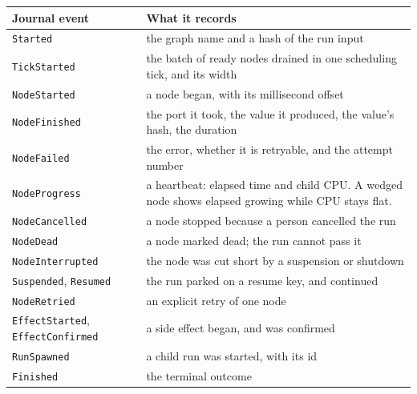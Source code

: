 \begin{center}
\begin{tabular}{@{}>{\raggedright\arraybackslash}p{}>{\raggedright\arraybackslash}p{}@{}}
  \toprule
  \textbf{Journal event} & \textbf{What it records} \\
  \midrule
  \texttt{Started} & the graph name and a hash of the run input \\
  \texttt{TickStarted} & the batch of ready nodes drained in one scheduling tick, and its width \\
  \texttt{NodeStarted} & a node began, with its millisecond offset \\
  \texttt{NodeFinished} & the port it took, the value it produced, the value's hash, the
    duration \\
  \texttt{NodeFailed} & the error, whether it is retryable, and the attempt number \\
  \texttt{NodeProgress} & a heartbeat: elapsed time and child CPU. A wedged node shows elapsed
    growing while CPU stays flat. \\
  \texttt{NodeCancelled} & a node stopped because a person cancelled the run \\
  \texttt{NodeDead} & a node marked dead; the run cannot pass it \\
  \texttt{NodeInterrupted} & the node was cut short by a suspension or shutdown \\
  \texttt{Suspended}, \texttt{Resumed} & the run parked on a resume key, and continued \\
  \texttt{NodeRetried} & an explicit retry of one node \\
  \texttt{EffectStarted}, \texttt{EffectConfirmed} & a side effect began, and was confirmed \\
  \texttt{RunSpawned} & a child run was started, with its id \\
  \texttt{Finished} & the terminal outcome \\
  \bottomrule
\end{tabular}
\end{center}

